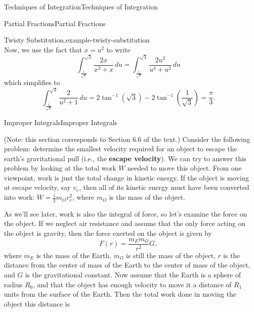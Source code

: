 \documentclass[10pt,]{book}
\newcommand{\terminology}[1]{\textbf{#1}}
\numberwithin{equation}{section}
\begin{document}
\begin{chapterptx}{Techniques of Integration}{}{Techniques of Integration}{}{}
\begin{sectionptx}{Partial Fractions}{}{Partial Fractions}{}{}
\begin{example}{Twisty Substitution.}{example-twisty-substitution}
\begin{equation*}
\end{equation*}
Now, we use the fact that \(x = u^{2}\) to write%
\begin{equation*}
\int_{\frac{1}{\sqrt{3}}}^{\sqrt{3}}\frac{2x}{x^{2} + x}\,du = \int_{\frac{1}{\sqrt{3}}}^{\sqrt{3}}\frac{2u^{2}}{u^{4} + u^{2}}\,du
\end{equation*}
which simplifies to%
\begin{equation*}
\int_{\frac{1}{\sqrt{3}}}^{\sqrt{3}}\frac{2}{u^{2} + 1}\,du = 2\tan^{-1}(\sqrt{3}) - 2\tan^{-1}\left(\frac{1}{\sqrt{3}}\right) = \frac{\pi}{3}.
\end{equation*}
%
\end{example}
\end{sectionptx}
%
%
\typeout{************************************************}
\typeout{************************************************}
%
\begin{sectionptx}{Improper Integrals}{}{Improper Integrals}{}{}\label{section-improper-integrals}
\begin{introduction}{}%
\hypertarget{p-574}{}%
(Note: this section corresponds to Section 6.6 of the text.) Consider the following problem: determine the smallest velocity required for an object to escape the earth's gravitational pull (i.e., the \terminology{escape velocity}). We can try to answer this problem by looking at the total work \(W\) needed to move this object. From one viewpoint, work is just the total change in kinetic energy. If the object is moving at escape velocity, say \(v_{e}\), then all of its kinetic energy must have been converted into work: \(W = \frac{1}{2}m_{O}v_{e}^{2}\), where \(m_{O}\) is the mass of the object.%
\par
\hypertarget{p-575}{}%
As we'll see later, work is also the integral of force, so let's examine the force on the object. If we neglect air resistance and assume that the only force acting on the object is gravity, then the force exerted on the object is given by%
\begin{equation*}
F(r) = \frac{m_{E}m_{O}}{r^{2}}G,
\end{equation*}
where \(m_{E}\) is the mass of the Earth, \(m_{O}\) is still the mass of the object, \(r\) is the distance from the center of mass of the Earth to the center of mass of the object, and \(G\) is the gravitational constant. Now assume that the Earth is a sphere of radius \(R_{0}\), and that the object has enough velocity to move it a distance of \(R_{1}\) units from the surface of the Earth. Then the total work done in moving the object this distance is%

\end{introduction}
\end{sectionptx}
\end{chapterptx}
\end{document}
